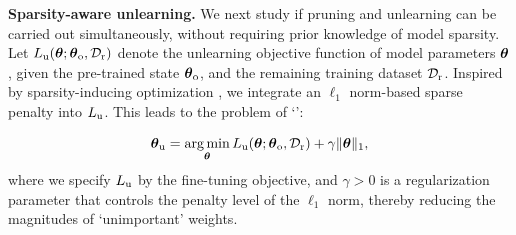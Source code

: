 






%
{\noindent \textbf{Sparsity-aware  unlearning.}}
We next study if pruning and unlearning can be carried out simultaneously, without requiring prior knowledge of model sparsity. Let $L_\mathrm{u} (\boldsymbol{\theta}; \boldsymbol \theta_\mathrm{o},  \mathcal D_\mathrm{r})$ denote the unlearning objective function of model parameters $\boldsymbol{\theta}$, given the pre-trained  state $\boldsymbol \theta_\mathrm{o}$, 
and the remaining training dataset $\mathcal D_\mathrm{r}$. %
Inspired by  sparsity-inducing optimization \cite{bach2012optimization}, we integrate an $\ell_1$ norm-based sparse penalty into  $L_\mathrm{u} $. This leads to the problem of `\textbf{\MUSparse}':

\vspace*{-3mm}
{\small{\begin{align}
    \boldsymbol \theta_\mathrm{u} = \operatorname*{arg\,min}_{\boldsymbol{\theta}} L_\mathrm{u} (\boldsymbol{\theta}; \boldsymbol \theta_\mathrm{o},  \mathcal D_\mathrm{r}) + \gamma \| \boldsymbol{\theta} \|_1,
    \label{eq: MUSparse}
\end{align}}}%
where we specify $L_\mathrm{u}$ by the fine-tuning objective, and $\gamma > 0$ is a regularization parameter that {controls the penalty level of the $\ell_1$ norm, thereby reducing the magnitudes of `unimportant' weights.}


